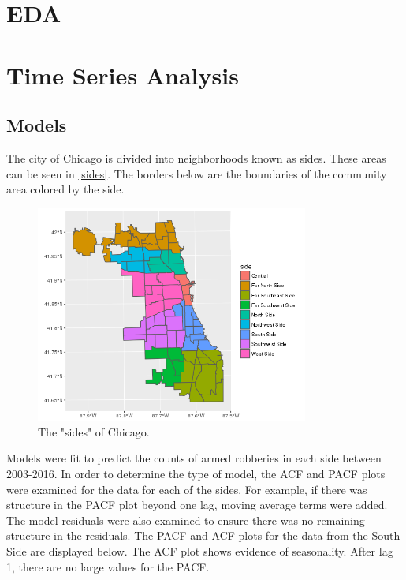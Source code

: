 \documentclass{article} %
\begin{document}
\section{EDA}

\section{Time Series Analysis}

\subsection{Models}

\noindent The city of Chicago is divided into neighborhoods known as sides. These areas can be seen in \autoref{sides}. The borders below are the boundaries of the community area colored by the side.  

\begin{figure}[h]
\begin{center}

\includegraphics[width=0.8\textwidth,keepaspectratio]{CopyOfside.png}
\caption{The "sides" of Chicago.}
\label{sides}
\end{center}
\end{figure}

\noindent Models were fit to predict the counts of armed robberies in each side between 2003-2016. In order to determine the type of model, the ACF and PACF plots were examined for the data for each of the sides. For example, if there was structure in the PACF plot beyond one lag, moving average terms were added. The model residuals were also examined to ensure there was no remaining structure in the residuals. The PACF and ACF plots for the data from the South Side are displayed below. The ACF plot shows evidence of seasonality. After lag 1, there are no large values for the PACF. \newline
\end{document}
